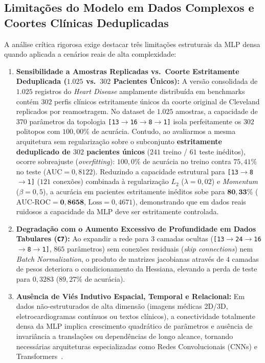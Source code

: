 \documentclass[runningheads]{llncs}
\begin{document}
\subsection{Limita\c{c}\~{o}es do Modelo em Dados Complexos e Coortes Cl\'{i}nicas Deduplicadas}
A an\'{a}lise cr\'{i}tica rigorosa exige destacar tr\^{e}s limita\c{c}\~{o}es estruturais da MLP densa quando aplicada a cen\'{a}rios reais de alta complexidade:
\begin{enumerate}
    \item \textbf{Sensibilidade a Amostras Replicadas vs.\ Coorte Estritamente Deduplicada ($1.025$ vs.\ $302$ Pacientes \'{U}nicos):} A vers\~{a}o consolidada de $1.025$ registros do \textit{Heart Disease} amplamente distribu\'{i}da em benchmarks cont\'{e}m $302$ perfis cl\'{i}nicos estritamente \'{u}nicos da coorte original de Cleveland replicados por reamostragem. No dataset de $1.025$ amostras, a capacidade de $370$ par\^{a}metros da topologia \texttt{[13$\to$16$\to$8$\to$1]} isola perfeitamente os $302$ politopos com $100{,}00\%$ de acur\'{a}cia. Contudo, ao avaliarmos a mesma arquitetura sem regulariza\c{c}\~{a}o sobre o subconjunto \textbf{estritamente deduplicado de $302$ pacientes \'{u}nicos} ($241$ treino / $61$ teste inéditos), ocorre sobreajuste (\textit{overfitting}): $100{,}0\%$ de acur\'{a}cia no treino contra $75{,}41\%$ no teste ($\text{AUC} = 0{,}8122$). Reduzindo a capacidade estrutural para \texttt{[13$\to$8$\to$1]} ($121$ conex\~{o}es) combinada \`{a} regulariza\c{c}\~{a}o $L_2$ ($\lambda = 0{,}02$) e \textit{Momentum} ($\beta = 0{,}5$), a acur\'{a}cia em pacientes estritamente in\'{e}ditos sobe para $\mathbf{80{,}33\%}$ ($\text{AUC-ROC} = \mathbf{0{,}8658}$, $\text{Loss} = 0{,}4671$), demonstrando que em dados reais ruidosos a capacidade da MLP deve ser estritamente controlada.
    \item \textbf{Degrada\c{c}\~{a}o com o Aumento Excessivo de Profundidade em Dados Tabulares (\texttt{C7}):} Ao expandir a rede para $3$ camadas ocultas (\texttt{[13$\to$24$\to$16$\to$8$\to$1]}, $865$ par\^{a}metros) sem conex\~{o}es residuais (\textit{skip connections}) nem \textit{Batch Normalization}, o produto de matrizes jacobianas através de $4$ camadas de pesos deteriora o condicionamento da Hessiana, elevando a perda de teste para $0{,}3283$ ($89{,}27\%$ de acur\'{a}cia).
    \item \textbf{Aus\^{e}ncia de Vi\'{e}s Indutivo Espacial, Temporal e Relacional:} Em dados n\~{a}o-estruturados de alta dimens\~{a}o (imagens m\'{e}dicas 2D/3D, eletrocardiogramas cont\'{i}nuos ou textos cl\'{i}nicos), a conectividade totalmente densa da MLP implica crescimento quadr\'{a}tico de par\^{a}metros e aus\^{e}ncia de invari\^{a}ncia a transla\c{c}\~{o}es ou depend\^{e}ncias de longo alcance, tornando necess\'{a}rias arquiteturas especializadas como Redes Convolucionais (CNNs) e Transformers~\cite{vaswani2017attention}.
\end{enumerate}



\end{document}
